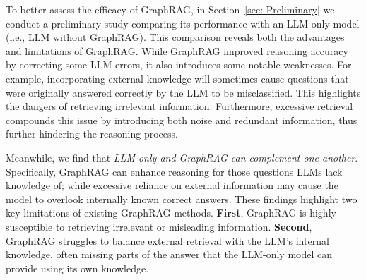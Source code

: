 \documentclass[11pt]{article}
\newcommand{\jt}[1]{{\color{red}[JT:#1]}}
\newcommand{\kai}[1]{{\color{blue}[Kai:#1]}}
\newcommand{\yu}[1]{{\color{brown}[yu:#1]}}
\begin{document}

To better assess the efficacy of GraphRAG, in Section~\ref{sec: Preliminary} we conduct a preliminary study comparing its performance with an LLM-only model (i.e., LLM without GraphRAG). This comparison reveals both the advantages and limitations of GraphRAG. While GraphRAG improved reasoning accuracy by correcting some LLM errors, it also introduces some notable weaknesses. For example, incorporating external knowledge will sometimes cause questions that were originally answered correctly by the LLM to be misclassified.  This highlights the dangers of retrieving irrelevant information.  Furthermore, excessive retrieval compounds this issue by introducing both noise and redundant information, thus further hindering the reasoning process. 

Meanwhile, we find that {\it LLM-only and GraphRAG can complement one another}. Specifically, GraphRAG can enhance reasoning for those questions LLMs lack knowledge of; while excessive reliance on external information may cause the model to overlook internally known correct answers. These findings highlight two key limitations of existing GraphRAG methods. {\bf First}, GraphRAG is highly susceptible to retrieving irrelevant or misleading information. {\bf Second}, GraphRAG struggles to balance external retrieval with the LLM’s internal knowledge, 
often missing parts of the answer that the LLM-only model can provide using its own knowledge.
\end{document}

